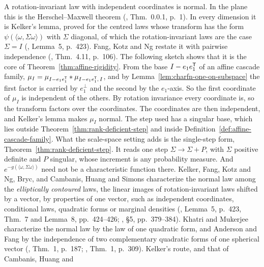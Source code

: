 \begin{remark}\label{rem:kelker}
A rotation-invariant law with independent coordinates is normal. In the plane this is the
Herschel--Maxwell theorem (, Thm.~0.0.1, p.~1).
In every dimension it is Kelker's lemma, proved for the centred laws whose transform has the form
$\psi(\langle\omega,\Sigma\omega\rangle)$ with $\Sigma$ diagonal, of which the rotation-invariant
laws are the case $\Sigma = I$ (, Lemma~5, p.~423). Fang, Kotz and Ng restate it with pairwise independence
(, Thm.~4.11, p.~106). The following sketch shows that it is the core of
Theorem~\ref{thm:affine-rigidity}. From the base $I - e_1e_1^{\mathsf{T}}$ of an affine cascade family,
$\mu_I = \mu_{I - e_1e_1^{\mathsf{T}}} * \mu_{I - e_1e_1^{\mathsf{T}},\,I}$, and by
Lemma~\ref{lem:charfn-one-on-subspace} the first factor is carried by $e_1^\perp$ and the second by
the $e_1$-axis. So the first coordinate of $\mu_I$ is independent of the others.
By rotation invariance every coordinate is, so the transform factors over the coordinates. The
coordinates are then independent, and Kelker's lemma makes $\mu_I$ normal. The step used has a singular base, which lies
outside Theorem~\ref{thm:rank-deficient-step} and inside Definition~\ref{def:affine-cascade-family}. What the scale-space
setting adds is the single-step form, Theorem~\ref{thm:rank-deficient-step}. It reads one step
$\Sigma \to \Sigma + P$, with $\Sigma$ positive definite and $P$ singular, whose increment is any
probability measure. And $e^{-g(\langle\omega,\Sigma\omega\rangle)}$ need not be a characteristic
function there. Kelker, Fang, Kotz and Ng, Bryc,
and Cambanis, Huang and Simons characterize the normal law among the \emph{elliptically contoured}
laws, the linear images of rotation-invariant laws shifted by a vector, by
properties of one vector, such as independent coordinates, conditional laws, quadratic forms or
marginal densities (, Lemma~5, p.~423, Thm.~7 and Lemma~8,
pp.~424--426; , \S5, pp.~379--384). Khatri and Mukerjee characterize the
normal law by the law of one quadratic form, and Anderson and Fang by the independence of two complementary
quadratic forms of one spherical vector (, Thm.~1, p.~187;
, Thm.~1, p.~309). Kelker's route, and that of Cambanis, Huang and

\end{remark}
